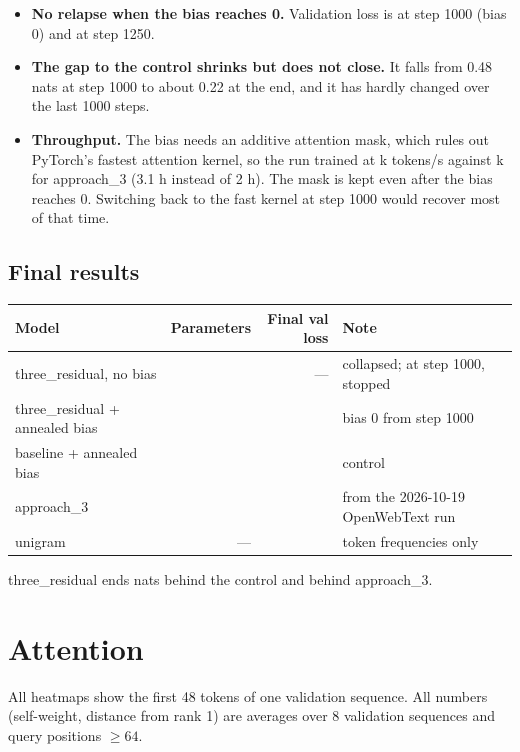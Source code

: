 \documentclass[11pt]{article}
\newcommand{\tr}{three\_residual}
\begin{document}
\begin{itemize}
\item \textbf{No relapse when the bias reaches 0.} Validation loss is \ValThreeAtOneK{} at step 1000 (bias 0)
and \ValThreeAtOneTwoFiveK{} at step 1250.
\item \textbf{The gap to the control shrinks but does not close.} It falls from 0.48 nats at step 1000 to about
0.22 at the end, and it has hardly changed over the last 1000 steps.
\item \textbf{Throughput.} The bias needs an additive attention mask, which rules out PyTorch's fastest attention
kernel, so the run trained at \TokThree{}k tokens/s against \TokAppThree{}k for approach\_3 (3.1 h instead of 2 h).
The mask is kept even after the bias reaches 0. Switching back to the fast kernel at step 1000 would recover
most of that time.
\end{itemize}

\subsection{Final results}
\begin{center}\small
\begin{tabular}{lrrl}
\toprule
Model & Parameters & Final val loss & Note \\
\midrule
\tr{}, no bias & \ParamsThree{} & --- & collapsed; \CollapsedVal{} at step 1000, stopped \\
\tr{} + annealed bias & \ParamsThree{} & \FinalThree{} & bias 0 from step 1000 \\
baseline + annealed bias & \ParamsBase{} & \FinalBaseB{} & control \\
approach\_3 & \ParamsBase{} & \FinalAppThree{} & from the 2026-10-19 OpenWebText run \\
unigram & --- & \Unigram{} & token frequencies only \\
\bottomrule
\end{tabular}
\end{center}
\tr{} ends \GapBase{} nats behind the control and \GapAppThree{} behind approach\_3.

\section{Attention}
All heatmaps show the first 48 tokens of one validation sequence. All numbers (self-weight, distance from
rank 1) are averages over 8 validation sequences and query positions $\ge 64$.
\end{document}
